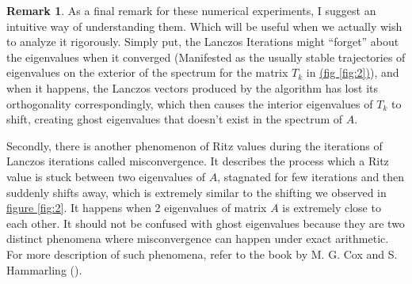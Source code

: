 \documentclass[]{article}
\theoremstyle{definition}
\newtheorem{remark}{Remark}[subsection]  %
\begin{document}
            \begin{remark}
                As a final remark for these numerical experiments, I suggest an intuitive way of understanding them. Which will be useful when we actually wish to analyze it rigorously. Simply put, the Lanczos Iterations might ``forget'' about the eigenvalues when it converged (Manifested as the usually stable trajectories of eigenvalues on the exterior of the spectrum for the matrix $T_k$ in \hyperref[fig:2]{(fig \ref*{fig:2})}), and when it happens, the Lanczos vectors produced by the algorithm has lost its orthogonality correspondingly, which then causes the interior eigenvalues of $T_k$ to shift, creating ghost eigenvalues that doesn't exist in the spectrum of $A$. 
                \par
                Secondly, there is another phenomenon of Ritz values during the iterations of Lanczos iterations called misconvergence. It describes the process which a Ritz value is stuck between two eigenvalues of $A$, stagnated for few iterations and then suddenly shifts away, which is extremely similar to the shifting we observed in \hyperref[fig:2]{figure \ref*{fig:2}}. It happens when 2 eigenvalues of matrix $A$ is extremely close to each other. It should not be confused with ghost eigenvalues because they are two distinct phenomena where misconvergence can happen under exact arithmetic. For more description of such phenomena, refer to the book by M. G. Cox and S. Hammarling (\cite{book:reliable_computation}). 
            \end{remark}
\end{document}
